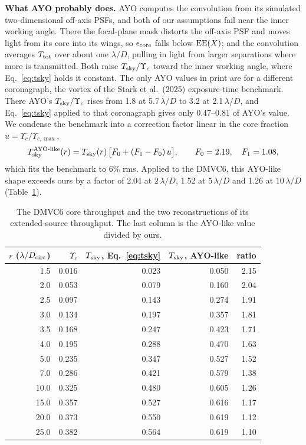 \documentclass[11pt,a4paper]{article}
\begin{document}
\textbf{What AYO probably does.} AYO computes the convolution from its simulated two-dimensional
off-axis PSFs, and both of our assumptions fail near the inner working angle. There the
focal-plane mask distorts the off-axis PSF and moves light from its core into its wings, so
$\epsilon_{\rm core}$ falls below ${\rm EE}(X)$; and the convolution averages $T_{\rm tot}$ over
about one $\lambda/D$, pulling in light from larger separations where more is transmitted. Both
raise $T_{\rm sky}/\Upsilon_c$ toward the inner working angle, where Eq.~\eqref{eq:tsky} holds it
constant. The only AYO values in print are for a different coronagraph, the vortex of the Stark
et al.\ (2025) exposure-time benchmark. There AYO's $T_{\rm sky}/\Upsilon_c$ rises from
1.8 at 5.7\,$\lambda/D$ to 3.2 at 2.1\,$\lambda/D$, and
Eq.~\eqref{eq:tsky} applied to that coronagraph gives only 0.47--0.81 of
AYO's value. We condense the benchmark into a correction factor linear in the core fraction
$u = \Upsilon_c/\Upsilon_{c,\max}$,
\begin{equation}
T_{\rm sky}^{\rm AYO\text{-}like}(r) = T_{\rm sky}(r)\,\big[F_0 + (F_1 - F_0)\,u\big],
\qquad F_0 = 2.19,\quad F_1 = 1.08,
\label{eq:tskyayo}
\end{equation}
which fits the benchmark to 6\% rms. Applied to the DMVC6, this AYO-like shape exceeds
ours by a factor of 2.04 at $2\,\lambda/D$, 1.52 at $5\,\lambda/D$ and 1.26 at
$10\,\lambda/D$ (Table~\ref{tab:tsky}).

\begin{table}[htbp]
\centering
\small
\begin{tabular}{rrrrr}
\toprule
$r$ ($\lambda/D_{\rm circ}$) & $\Upsilon_c$ & $T_{\rm sky}$, Eq.~\eqref{eq:tsky} &
$T_{\rm sky}$, AYO-like & \textbf{ratio} \\
\midrule
1.5 & 0.016 & 0.023 & 0.050 & 2.15 \\
2.0 & 0.053 & 0.079 & 0.160 & 2.04 \\
2.5 & 0.097 & 0.143 & 0.274 & 1.91 \\
3.0 & 0.134 & 0.197 & 0.357 & 1.81 \\
3.5 & 0.168 & 0.247 & 0.423 & 1.71 \\
4.0 & 0.195 & 0.288 & 0.470 & 1.63 \\
5.0 & 0.235 & 0.347 & 0.527 & 1.52 \\
7.0 & 0.286 & 0.421 & 0.579 & 1.38 \\
10.0 & 0.325 & 0.480 & 0.605 & 1.26 \\
15.0 & 0.357 & 0.527 & 0.616 & 1.17 \\
20.0 & 0.373 & 0.550 & 0.619 & 1.12 \\
25.0 & 0.382 & 0.564 & 0.619 & 1.10 \\
\bottomrule
\end{tabular}
\caption{The DMVC6 core throughput and the two reconstructions of its extended-source throughput.
The last column is the AYO-like value divided by ours.}
\label{tab:tsky}
\end{table}
\end{document}

